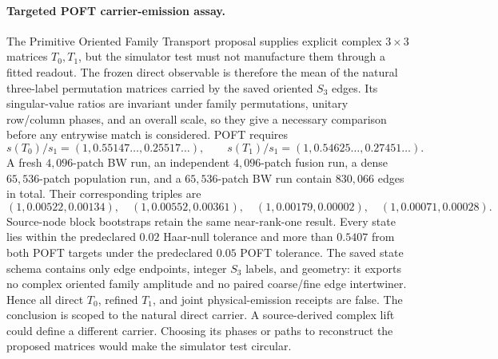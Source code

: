 \documentclass[11pt]{article}
\begin{document}
\paragraph{Targeted POFT carrier-emission assay.}
The Primitive Oriented Family Transport proposal supplies explicit complex $3\times3$ matrices
$T_0,T_1$, but the simulator test must not manufacture them through a fitted readout.  The frozen
direct observable is therefore the mean of the natural three-label permutation matrices carried by
the saved oriented $S_3$ edges.  Its singular-value ratios are invariant under family permutations,
unitary row/column phases, and an overall scale, so they give a necessary comparison before any
entrywise match is considered.  POFT requires
\[
s(T_0)/s_1=(1,0.55147\ldots,0.25517\ldots),\qquad
s(T_1)/s_1=(1,0.54625\ldots,0.27451\ldots).
\]
A fresh $4{,}096$-patch BW run, an independent $4{,}096$-patch fusion run, a dense
$65{,}536$-patch population run, and a $65{,}536$-patch BW run contain $830{,}066$ edges in
total.  Their corresponding triples are
\[
(1,0.00522,0.00134),\quad(1,0.00552,0.00361),\quad
(1,0.00179,0.00002),\quad(1,0.00071,0.00028).
\]
Source-node block bootstraps retain the same near-rank-one result.  Every state lies within the
predeclared $0.02$ Haar-null tolerance and more than $0.5407$ from both POFT targets under the
predeclared $0.05$ POFT tolerance.  The saved state schema contains only edge endpoints,
integer $S_3$ labels, and geometry: it exports no complex oriented family amplitude and no paired
coarse/fine edge intertwiner.  Hence all direct $T_0$, refined $T_1$, and joint physical-emission
receipts are false.  The conclusion is scoped to the natural direct carrier.  A source-derived
complex lift could define a different carrier.  Choosing its phases or paths to reconstruct the
proposed matrices would make the simulator test circular.
\end{document}
